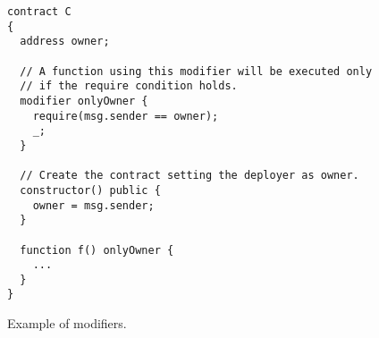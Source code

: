 \begin{figure}
\begin{verbatim}
contract C
{
  address owner;

  // A function using this modifier will be executed only
  // if the require condition holds.
  modifier onlyOwner {
    require(msg.sender == owner);
    _;
  }

  // Create the contract setting the deployer as owner.
  constructor() public {
    owner = msg.sender;
  }

  function f() onlyOwner {
    ...
  }
}
\end{verbatim}
\caption{Example of modifiers.}
\label{fig:modifiers}
\end{figure}

